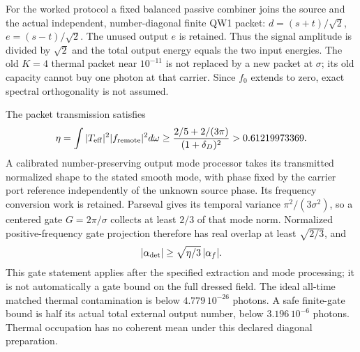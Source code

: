 \documentclass[10pt,twocolumn,letterpaper]{article}
\begin{document}
For the worked protocol a fixed balanced passive combiner joins the source
and the actual independent, number-diagonal finite QW1 packet:
$d=(s+t)/\sqrt2$, $e=(s-t)/\sqrt2$.  The unused output $e$ is retained.
Thus the signal amplitude is divided by $\sqrt2$ and the total output energy
equals the two input energies.  The old $K=4$ thermal packet near
$10^{-11}$ is not replaced by a new packet at $\sigma$; its old capacity
cannot buy one photon at that carrier.  Since $f_0$ extends to zero, exact
spectral orthogonality is not assumed.

The packet transmission satisfies
\[
 \eta=\int |T_{\rm eff}|^2|f_{\rm remote}|^2d\omega
 \geq\frac{2/5+2/(3\pi)}{(1+\delta_D)^2}>0.61219973369.
\]
A calibrated number-preserving output mode processor takes its transmitted
normalized shape to the stated smooth mode, with phase fixed by the carrier
port reference independently of the unknown source phase.  Its frequency
conversion work is retained.  Parseval gives its temporal variance
$\pi^2/(3\sigma^2)$, so a centered gate $G=2\pi/\sigma$ collects at least
$2/3$ of that mode norm.  Normalized positive-frequency gate projection
therefore has real overlap at least $\sqrt{2/3}$, and
\[
 |\alpha_{\rm det}|\geq\sqrt{\eta/3}\,|\alpha_f|.
\]
This gate statement applies after the specified extraction and mode
processing; it is not automatically a gate bound on the full dressed field.
The ideal all-time matched thermal contamination is below
$4.779\,10^{-26}$ photons.  A safe finite-gate bound is half its actual total
external output number, below $3.196\,10^{-6}$ photons.  Thermal occupation
has no coherent mean under this declared diagonal preparation.
\end{document}
